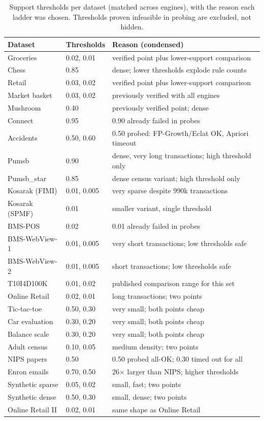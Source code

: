 \documentclass[journal,a4paper]{IEEEtran}
\begin{document}
\begin{table}[t]
\centering
\footnotesize
\caption{Support thresholds per dataset (matched across engines),
with the reason each ladder was chosen. Thresholds proven infeasible
in probing are excluded, not hidden.}
\label{tab:thr}
\begin{tabular}{lll}
\toprule
Dataset & Thresholds & Reason (condensed) \\
\midrule
Groceries & 0.02, 0.01 & verified point plus lower-support comparison \\
Chess & 0.85 & dense; lower thresholds explode rule counts \\
Retail & 0.03, 0.02 & verified point plus lower-support comparison \\
Market basket & 0.03, 0.02 & previously verified with all engines \\
Mushroom & 0.40 & previously verified point; dense \\
Connect & 0.95 & 0.90 already failed in probes \\
Accidents & 0.50, 0.60 & 0.50 probed: FP-Growth/Eclat OK, Apriori timeout \\
Pumsb & 0.90 & dense, very long transactions; high threshold only \\
Pumsb\_star & 0.85 & dense census variant; high threshold only \\
Kosarak (FIMI) & 0.01, 0.005 & very sparse despite 990k transactions \\
Kosarak (SPMF) & 0.01 & smaller variant, single threshold \\
BMS-POS & 0.02 & 0.01 already failed in probes \\
BMS-WebView-1 & 0.01, 0.005 & very short transactions; low thresholds safe \\
BMS-WebView-2 & 0.01, 0.005 & short transactions; low thresholds safe \\
T10I4D100K & 0.01, 0.02 & published comparison range for this set \\
Online Retail & 0.02, 0.01 & long transactions; two points \\
Tic-tac-toe & 0.50, 0.30 & very small; both points cheap \\
Car evaluation & 0.30, 0.20 & very small; both points cheap \\
Balance scale & 0.30, 0.20 & very small; both points cheap \\
Adult census & 0.10, 0.05 & medium density; two points \\
NIPS papers & 0.50 & 0.50 probed all-OK; 0.30 timed out for all \\
Enron emails & 0.70, 0.50 & 26$\times$ larger than NIPS; higher thresholds \\
Synthetic sparse & 0.05, 0.02 & small, fast; two points \\
Synthetic dense & 0.50, 0.30 & small, dense; two points \\
Online Retail II & 0.02, 0.01 & same shape as Online Retail \\
\bottomrule
\end{tabular}
\end{table}
\end{document}
